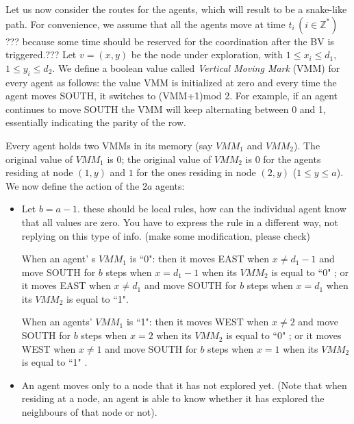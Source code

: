 Let us now consider the routes for the agents, which will result to be a snake-like path. For convenience, we assume that all the agents move at time $t_i\,(i\in\mathbb{Z}^*)$  \color{blue} ??? because some time should be reserved for the coordination after the BV is triggered.???\color{black} 
Let $v=(x, y)$ be the node under exploration, with $1\leq x_i \leq d_1$, $1\leq y_i \leq d_2$. 
We define a boolean value called {\em Vertical Moving Mark}  (VMM) for every agent as follows: 
the value  VMM is initialized at zero and    every time   the agent moves SOUTH, it switches to  (VMM+1)mod 2. 
  For example, if an agent continues to move SOUTH  the VMM will keep alternating between 0 and 1, essentially indicating the parity of the row.
  
Every agent holds two VMMs in its memory  (say $VMM_1$ and $VMM_2$). 
The original value of $VMM_1$ is $0$; 
the original value of $VMM_2$ is 0 for the agents 
residing at node $(1, y)$ and  $1$ for the ones residing in node  $(2, y)$ ($1\leq y\leq a$).
We now define the action of the $2a$ agents:\\ 
\begin{itemize}
\item Let $b=a-1$. 
\color{blue} these should be local rules, how can the individual agent know that all values are zero. You have to express the rule in a different way, not replying on this type of info. (make some modification, please check)\color{black}

When an agent' s $VMM_1$ is ``0": then it moves EAST when $x\neq d_1-1$ and move SOUTH for $b$ steps when $x=d_1-1$ when its $VMM_2$ is equal to ``0" ; or it moves EAST when $x\neq d_1$ and move SOUTH for $b$ steps  when $x=d_1$ when its $VMM_2$ is equal to ``1". 

When an agents' $VMM_1$ is ``1": then it moves WEST when $x\neq2$ and move SOUTH for $b$ steps when $x=2$ when its $VMM_2$ is equal to ``0"  ; or it moves WEST when $x\neq 1$ and move SOUTH for $b$ steps when $x=1$ when its $VMM_2$ is equal to ``1" .

\item An agent  moves only to a node that it has not explored yet. (Note that when residing at a node, an agent is able to know whether it has explored the neighbours of that node or not).
\end{itemize}

